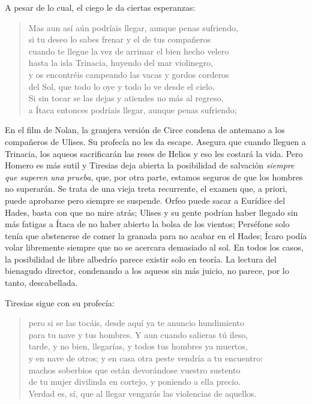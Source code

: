 \documentclass[11pt,a4paper]{article}
\begin{document}
A pesar de lo cual, el ciego le da ciertas esperanzas:

\begin{verse}
Mas aun así aún podríais llegar, aunque penas sufriendo,\\
si tu deseo lo sabes frenar y el de tus compañeros\\
cuando te llegue la vez de arrimar el bien hecho velero\\
hasta la isla Trinacia, huyendo del mar violinegro,\\
y os encontréis campeando las vacas y gordos corderos\\
del Sol, que todo lo oye y todo lo ve desde el cielo.\\
Si sin tocar se las dejas y atiendes no más al regreso,\\
a Ítaca entonces podríais llegar, aunque penas sufriendo;
\end{verse}

En el film de Nolan, la granjera versión de Circe condena de antemano a los compañeros de Ulises. Su profecía no les da escape. Asegura que cuando lleguen a Trinacia, los aqueos sacrificarán las reses de Helios y eso les costará la vida. Pero Homero es más sutil y Tiresias deja abierta la posibilidad de salvación \emph{siempre que superen una prueba}, que, por otra parte, estamos seguros de que los hombres no superarán. Se trata de una vieja treta recurrente, el examen que, a priori, puede aprobarse pero siempre se suspende. Orfeo puede sacar a Eurídice del Hades, basta con que no mire atrás; Ulises y su gente podrían haber llegado sin más fatigas a Ítaca de no haber abierto la bolsa de los vientos; Perséfone solo tenía que abstenerse de comer la granada para no acabar en el Hades; Ícaro podía volar libremente siempre que no se acercara demasiado al sol. En todos los casos, la posibilidad de libre albedrío parece existir solo en teoría. La lectura del bienagudo director, condenando a los aqueos sin más juicio, no parece, por lo tanto, descabellada.

Tiresias sigue con su profecía:

\begin{verse}
pero si se las tocáis, desde aquí ya te anuncio hundimiento\\
para tu nave y tus hombres. Y aun cuando salieras tú ileso,\\
tarde, y no bien, llegarías, y todos tus hombres ya muertos,\\
y en nave de otros; y en casa otra peste vendría a tu encuentro:\\
machos soberbios que están devorándose vuestro sustento\\
de tu mujer divilinda en cortejo, y poniendo a ella precio.\\
Verdad es, sí, que al llegar vengarás las violencias de aquellos.
\end{verse}
\end{document}
